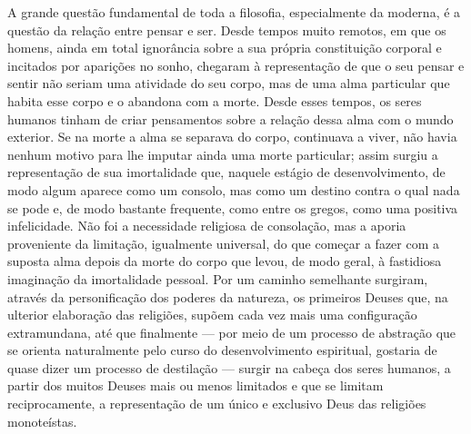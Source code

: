 \noindent{}A grande questão fundamental de toda a filosofia, especialmente da %
moderna, é a questão da relação entre pensar e ser. Desde tempos muito
remotos, em que os homens, ainda em total ignorância sobre a sua própria
constituição corporal e incitados por aparições no sonho,
chegaram à representação de que o seu pensar e sentir não seriam uma
atividade do seu corpo, mas de uma alma particular que habita esse
corpo e o abandona com a morte. Desde esses tempos, os seres humanos
tinham de criar pensamentos sobre a relação dessa alma com o mundo
exterior. Se na morte a alma se separava do corpo, continuava a viver, %
não havia nenhum motivo para lhe imputar ainda uma morte particular;
assim surgiu a representação de sua imortalidade que, naquele estágio de
desenvolvimento, de modo algum aparece como um consolo, mas como um
destino contra o qual nada se pode e, de modo bastante frequente, como
entre os gregos, como uma positiva infelicidade. Não foi a necessidade
religiosa de consolação, mas a aporia proveniente 
da limitação, igualmente universal, do que começar a fazer com a suposta
alma depois da morte do corpo que levou, de modo geral, à fastidiosa
imaginação da imortalidade pessoal. Por um caminho semelhante surgiram,
através da personificação dos poderes da natureza, os primeiros Deuses
que, na ulterior elaboração das religiões, supõem cada vez mais uma
configuração extramundana, até que finalmente --- por meio de um processo
de abstração que se orienta naturalmente pelo curso do desenvolvimento
espiritual, gostaria de quase dizer um processo de destilação --- surgir %
na cabeça dos seres humanos, a partir dos muitos Deuses mais ou menos
limitados e que se limitam reciprocamente, a representação de um único e
exclusivo Deus das religiões monoteístas. %


